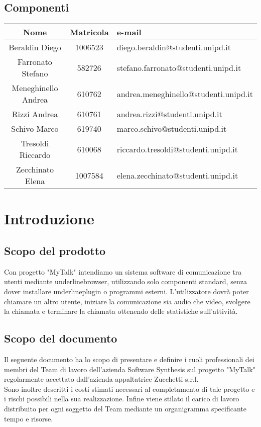 \subsection{Componenti}
\begin{center}
\begin{tabularx}{0.9\textwidth}{c|c|l}
{\bf Nome}&{\bf Matricola}&{\bf e-mail}\\ 
\hline
Beraldin Diego & 1006523&diego.beraldin@studenti.unipd.it\\
Farronato Stefano & 582726&stefano.farronato@studenti.unipd.it\\
Meneghinello Andrea & 610762&andrea.meneghinello@studenti.unipd.it\\
Rizzi Andrea & 610761&andrea.rizzi@studenti.unipd.it\\
Schivo Marco & 619740&marco.schivo@studenti.unipd.it\\
Tresoldi Riccardo & 610068&riccardo.tresoldi@studenti.unipd.it\\
Zecchinato Elena & 1007584&elena.zecchinato@studenti.unipd.it\\
\end{tabularx}
\end{center}

\clearpage
\section{Introduzione}
\subsection{Scopo del prodotto}
Con progetto "MyTalk" intendiamo un sistema software di comunicazione tra utenti mediante underline{browser}, utilizzando solo componenti standard, senza dover installare underline{plugin} o programmi esterni. L'utilizzatore dovrà poter chiamare un altro utente, iniziare la comunicazione sia audio che video, svolgere la chiamata e terminare la chiamata ottenendo delle statistiche sull'attività.

\subsection{Scopo del documento}
Il seguente documento ha lo scopo di presentare e definire i ruoli professionali dei membri del Team di lavoro dell'azienda Software Synthesis sul progetto "MyTalk" regolarmente accettato dall'azienda appaltatrice Zucchetti s.r.l.\\
Sono inoltre descritti i costi stimati necessari al completamento di tale progetto e i rischi possibili nella sua realizzazione. Infine viene stilato il carico di lavoro distribuito per ogni soggetto del Team mediante un organigramma specificante tempo e risorse.
